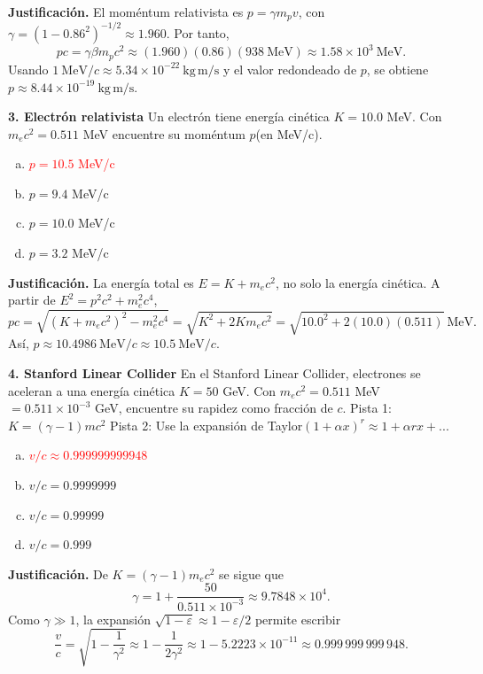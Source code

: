 \textbf{Justificación.} El moméntum relativista es $p=\gamma m_pv$, con $\gamma=(1-0.86^2)^{-1/2}\approx1.960$. Por tanto,
\[
pc=\gamma\beta m_pc^2\approx(1.960)(0.86)(938\ \mathrm{MeV})
\approx1.58\times10^3\ \mathrm{MeV}.
\]
Usando $1\ \mathrm{MeV}/c\approx5.34\times10^{-22}\ \mathrm{kg\,m/s}$ y el valor redondeado de $p$, se obtiene $p\approx8.44\times10^{-19}\ \mathrm{kg\,m/s}$.

\textbf{3. Electrón relativista}
Un electrón tiene energía cinética $K= 10.0$ MeV. Con $m_e c^2= 0.511$ MeV encuentre su moméntum $p$(en MeV/c).
\begin{enumerate}[a)]
    \item \textcolor{red}{$p= 10.5$ MeV/c}
    \item $p= 9.4$ MeV/c
    \item $p= 10.0$ MeV/c
    \item $p= 3.2$ MeV/c
\end{enumerate}

\textbf{Justificación.} La energía total es $E=K+m_ec^2$, no solo la energía cinética. A partir de $E^2=p^2c^2+m_e^2c^4$,
\[
pc=\sqrt{(K+m_ec^2)^2-m_e^2c^4}
=\sqrt{K^2+2Km_ec^2}
=\sqrt{10.0^2+2(10.0)(0.511)}\ \mathrm{MeV}.
\]
Así, $p\approx10.4986\ \mathrm{MeV}/c\approx10.5\ \mathrm{MeV}/c$.

\textbf{4. Stanford Linear Collider}
En el Stanford Linear Collider, electrones se aceleran a una energía cinética $K= 50$ GeV. Con $m_e c^2= 0.511$ MeV$= 0.511 \times 10^{-3}$ GeV, encuentre su rapidez como fracción de $c$.
Pista 1: $K=(\gamma -1)mc^2$
Pista 2: Use la expansión de Taylor$(1+ \alpha x)^r \approx 1+ \alpha rx+...$
\begin{enumerate}[a)]
    \item \textcolor{red}{$v/c \approx 0.999 999 999 948$}
    \item $v/c= 0.9999999$
    \item $v/c= 0.99999$
    \item $v/c= 0.999$
\end{enumerate}

\textbf{Justificación.} De $K=(\gamma-1)m_ec^2$ se sigue que
\[
\gamma=1+\frac{50}{0.511\times10^{-3}}\approx9.7848\times10^4.
\]
Como $\gamma\gg1$, la expansión $\sqrt{1-\varepsilon}\approx1-\varepsilon/2$ permite escribir
\[
\frac{v}{c}=\sqrt{1-\frac{1}{\gamma^2}}
\approx1-\frac{1}{2\gamma^2}
\approx1-5.2223\times10^{-11}
\approx0.999\,999\,999\,948.
\]

